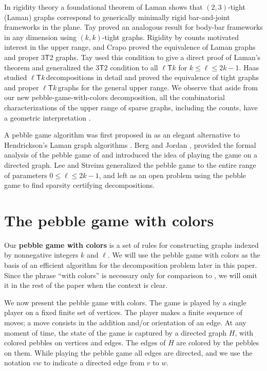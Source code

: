 \documentclass[Svgc,nospthms]{Svgc}
\newcommand{\ellteekay}{\ensuremath{\ell{\mathsf T}k}\,}
\begin{document}
In rigidity theory a foundational theorem of Laman \cite{laman} shows that  
$(2,3)$-tight (Laman) graphs correspond to generically minimally rigid bar-and-joint 
frameworks in the plane.  Tay \cite{tay:rigidityMultigraphs-I:1984} proved an analogous  
result for body-bar frameworks in any dimension using $(k,k)$-tight graphs.  Rigidity by counts
motivated interest 
in the upper range, and Crapo \cite{crapo:rigidity:88} proved the equivalence of Laman
graphs and proper $3\mathsf{T}2$ graphs.  Tay \cite{Tay93} used this condition 
to give a direct proof of Laman's theorem and generalized the $3\mathsf{T}2$ condition
to all $\ell\mathsf{T}k$ for $k\le \ell\le 2k-1$.
Haas \cite{haas:2002} studied 
\ellteekay decompositions in detail and proved the equivalence of tight graphs and 
proper \ellteekay graphs for the general upper range.  We observe that aside 
from our new pebble-game-with-colors decomposition, all the combinatorial 
characterizations of the upper range of sparse graphs, including the counts,
have a geometric interpretation 
\cite{whiteley:union-matroids,laman,Tay93,tay:rigidityMultigraphs-I:1984}.

A pebble game algorithm was first proposed in \cite{jacobs:hendrickson:PebbleGame:1997a} as an elegant 
alternative to Hendrickson's Laman graph  algorithms
\cite{hendrickson:uniqueRealizability:1992}. Berg and Jordan  
\cite{berg:jordan:2003}, provided the formal analysis of the pebble game of \cite{jacobs:hendrickson:PebbleGame:1997a} and introduced 
the idea of playing the game on a directed graph. Lee and Streinu \cite{pebblegame} 
generalized the pebble game to the entire range of parameters $0\le \ell\le 2k-1$, 
and left as an open problem using the pebble game to find 
sparsity certifying decompositions.  

\section{The pebble game with colors}
Our {\bf pebble game with colors} is a set of rules for 
constructing graphs indexed by nonnegative integers $k$ and $\ell$.  
We will use the pebble game with colors as the basis of an efficient 
algorithm for the decomposition problem later in this paper.
Since the 
phrase ``with colors'' is necessary only for comparison to \cite{pebblegame},
we will omit it in the rest of the paper when the context is clear.

We now present the pebble game with colors.
The game is played by a single player on a fixed finite set of
vertices. The player makes a finite sequence of moves;  a move
consists in the addition and/or orientation of an edge. At any
moment of time, the state of the game is captured by a directed 
graph $H$, with colored pebbles on vertices and edges.  
The edges of $H$ are colored by the pebbles on them.  
While playing the pebble game all edges are directed, and we use the 
notation $vw$ to indicate a directed edge from $v$ to $w$.
\end{document}
